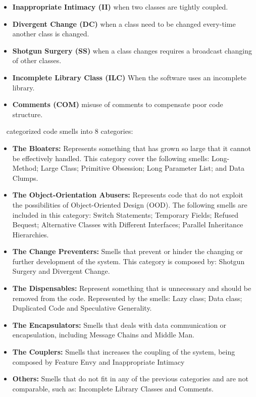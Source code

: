 \begin{itemize}
	\item \textbf{Inappropriate Intimacy (II)} when two classes are tightly coupled.
	\item \textbf{Divergent Change (DC)} when a class need to be changed every-time another class is changed.
	\item \textbf{Shotgun Surgery (SS)} when a class changes requires a broadcast changing of other classes.
	\item \textbf{Incomplete Library Class (ILC)} When the software uses an incomplete library.
	\item \textbf{Comments (COM)} misuse of comments to compensate poor code structure.
\end{itemize}

~\citet{mantyla2003bad} categorized code smells into 8 categories: 
\begin{itemize}
    \item \textbf{The Bloaters:} Represents something that has grown so large that it cannot be effectively handled. This category cover the following smells: Long-Method; Large Class; Primitive Obsession; Long Parameter List; and Data Clumps.
    \item \textbf{The Object-Orientation Abusers:} Represents code that do not exploit the possibilities of Object-Oriented Design (OOD). The following smells are included in this category: Switch Statements; Temporary Fields; Refused Bequest; Alternative Classes with Different Interfaces; Parallel Inheritance Hierarchies.
    \item \textbf{The Change Preventers:} Smells that prevent or hinder the changing or further development of the system. This category is composed by: Shotgun Surgery and Divergent Change.
    \item \textbf{The Dispensables:} Represent something that is unnecessary and should be removed from the code. Represented by the smells: Lazy class; Data class; Duplicated Code and Speculative Generality.
    \item \textbf{The Encapsulators:} Smells that deals with data communication or encapsulation, including Message Chains and Middle Man.
    \item \textbf{The Couplers:} Smells that increases the coupling of the system, being composed by Feature Envy and Inappropriate Intimacy
    \item \textbf{Others:} Smells that do not fit in any of the previous categories and are not comparable, such as: Incomplete Library Classes and Comments.
\end{itemize}

